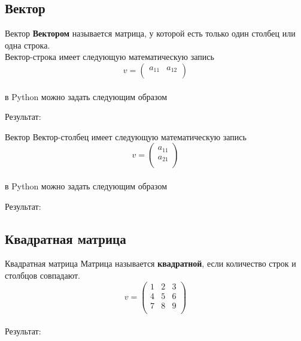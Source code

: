 \documentclass[12pt]{beamer}
\begin{document}
\subsection{Вектор}
\begin{frame}{Вектор}
\textbf{Вектором} называется матрица, у которой есть только один столбец или одна строка. \\
\vspace{0.5cm}
Вектор-строка имеет следующую математическую запись
\vspace{0.2cm}
\[
  v = 
  \begin{pmatrix}
    a_{11} & a_{12} \\
  \end{pmatrix}
\]
\\
\vspace{0.2cm}
в Python можно задать следующим образом
\vspace{0.2cm}

\vspace{0.2cm}
Результат: \\

\end{frame}


\begin{frame}{Вектор}
Вектор-столбец имеет следующую математическую запись
\vspace{0.2cm}
\[
  v = 
  \begin{pmatrix}
    a_{11}\\
    a_{21}\\
  \end{pmatrix}
\]
\\
\vspace{0.2cm}
в Python можно задать следующим образом
\vspace{0.2cm}

\vspace{0.2cm}
Результат: \\

\end{frame}


\subsection{Квадратная матрица}
\begin{frame}{Квадратная матрица}
Матрица называется \textbf{квадратной}, если количество строк и столбцов совпадают.
\vspace{0.2cm}
\[
  v = 
  \begin{pmatrix}
    1 & 2 & 3 \\
    4 & 5 & 6 \\
    7 & 8 & 9 \\
  \end{pmatrix}
\]
\\

Результат: \\

\end{frame}
\end{document}
